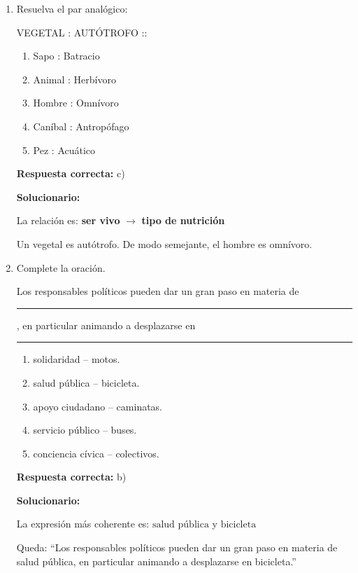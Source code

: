 \begin{enumerate}[resume]
	\vspace{2mm}
	\textbf{Solucionario:}
	
	\textbf{Camelar} significa enamorar, halagar o seducir.  
	Su antónimo es \textbf{execrar}, que significa aborrecer o condenar.
	
	\vspace{6mm}
	
	\item Resuelva el par analógico:
	
	VEGETAL : AUTÓTROFO ::
	\begin{enumerate}[label=\alph*)]
		\item Sapo : Batracio
		\item Animal : Herbívoro
		\item Hombre : Omnívoro
		\item Caníbal : Antropófago
		\item Pez : Acuático
	\end{enumerate}
	\textbf{Respuesta correcta:} c)
	
	\vspace{2mm}
	\textbf{Solucionario:}
	
	La relación es:
	\textbf{ser vivo} $\rightarrow$ \textbf{tipo de nutrición}
	
	Un vegetal es autótrofo.  
	De modo semejante, el hombre es omnívoro.
	
	\vspace{6mm}
	
	\item Complete la oración.
	
	Los responsables políticos pueden dar un gran paso en materia de \rule{2cm}{0.4pt}, en particular animando a desplazarse en \rule{2cm}{0.4pt}
	\begin{enumerate}[label=\alph*)]
		\item solidaridad -- motos.
		\item salud pública -- bicicleta.
		\item apoyo ciudadano -- caminatas.
		\item servicio público -- buses.
		\item conciencia cívica -- colectivos.
	\end{enumerate}
	\textbf{Respuesta correcta:} b)
	
	\vspace{2mm}
	\textbf{Solucionario:}
	
	La expresión más coherente es:
	$ \text{salud pública} $ y $ \text{bicicleta} $
	
	Queda:
	``Los responsables políticos pueden dar un gran paso en materia de salud pública, en particular animando a desplazarse en bicicleta.''
	

\end{enumerate}
